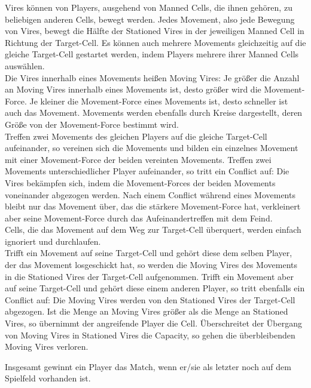Vires können von Players, ausgehend von Manned Cells, die ihnen gehören, zu beliebigen anderen Cells, bewegt werden. 
Jedes Movement, also jede Bewegung von Vires, bewegt die Hälfte der Stationed Vires in der jeweiligen Manned Cell in Richtung der Target-Cell.
Es können auch mehrere Movements gleichzeitig auf die gleiche Target-Cell gestartet werden, indem Players mehrere ihrer Manned Cells auswählen. \\
Die Vires innerhalb eines Movements heißen Moving Vires: Je größer die Anzahl an Moving Vires innerhalb eines Movements ist, desto größer wird die Movement-Force.
Je kleiner die Movement-Force eines Movements ist, desto schneller ist auch das Movement.
Movements werden ebenfalls durch Kreise dargestellt, deren Größe von der Movement-Force bestimmt wird. \\
Treffen zwei Movements des gleichen Players auf die gleiche Target-Cell aufeinander, so vereinen sich die Movements und bilden ein einzelnes Movement mit einer Movement-Force der beiden vereinten Movements.
Treffen zwei Movements unterschiedlicher Player aufeinander, so tritt ein Conflict auf: Die Vires bekämpfen sich, indem die Movement-Forces der beiden Movements voneinander abgezogen werden. Nach einem Conflict während eines Movements bleibt nur das Movement über, das die stärkere Movement-Force hat, verkleinert aber seine Movement-Force durch das Aufeinandertreffen mit dem Feind. \\
Cells, die das Movement auf dem Weg zur Target-Cell überquert, werden einfach ignoriert und durchlaufen. \\
Trifft ein Movement auf seine Target-Cell und gehört diese dem selben Player, der das Movement losgeschickt hat, so werden die Moving Vires des Movements in die Stationed Vires der Target-Cell aufgenommen.
Trifft ein Movement aber auf seine Target-Cell und gehört diese einem anderen Player, so tritt ebenfalls ein Conflict auf: Die Moving Vires werden von den Stationed Vires der Target-Cell abgezogen. Ist die Menge an Moving Vires größer als die Menge an Stationed Vires, so übernimmt der angreifende Player die Cell.
Überschreitet der Übergang von Moving Vires in Stationed Vires die Capacity, so gehen die überbleibenden Moving Vires verloren.

Insgesamt gewinnt ein Player das Match, wenn er/sie als letzter noch auf dem Spielfeld vorhanden ist.